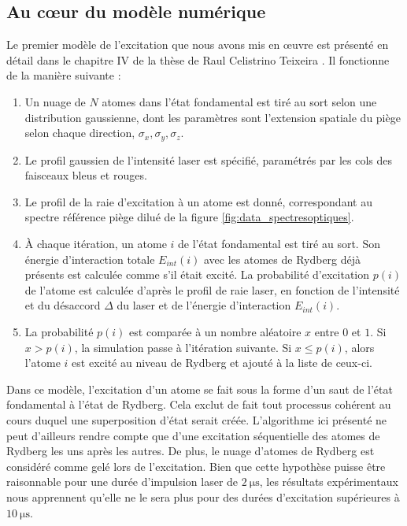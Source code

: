 	\subsection{Au c\oe ur du modèle numérique}\label{subsec:algo_1}
\noindent Le premier modèle de l'excitation que nous avons mis en \oe uvre est présenté en détail dans le chapitre IV de la thèse de Raul Celistrino Teixeira \cite{PHD_CELISTRINO}.
Il fonctionne de la manière suivante :
\begin{enumerate}
	\item Un nuage de $N$ atomes dans l'état fondamental est tiré au sort selon une distribution gaussienne, dont les paramètres sont l'extension spatiale du piège selon chaque direction, $\sigma_x,\sigma_y,\sigma_z$.
	\item Le profil gaussien de l'intensité laser est spécifié, paramétrés par les cols des faisceaux bleus et rouges.
	\item Le profil de la raie d'excitation à un atome est donné, correspondant au spectre \og référence piège dilué \fg{} de la figure \eqref{fig:data_spectresoptiques}.
	\item \`A chaque itération, un atome $i$ de l'état fondamental est tiré au sort.
	Son énergie d'interaction totale $E_{int}(i)$ avec les atomes de Rydberg déjà présents est calculée comme s'il était excité.
	La probabilité d'excitation $p(i)$ de l'atome est calculée d'après le profil de raie laser, en fonction de l'intensité  et du désaccord $\Delta$ du laser et de l'énergie d'interaction $E_{int}(i)$.
	\item La probabilité $p(i)$ est comparée à un nombre aléatoire $x$ entre $0$ et $1$. Si $x > p(i)$, la simulation passe à l'itération suivante.
	Si $x\leq p(i)$, alors l'atome $i$ est excité au niveau de Rydberg et ajouté à la liste de ceux-ci.
\end{enumerate}
%
Dans ce modèle, l'excitation d'un atome se fait sous la forme d'un \og saut \fg{} de l'état fondamental à l'état de Rydberg.
Cela exclut de fait tout processus cohérent au cours duquel une superposition d'état serait créée.
L'algorithme ici présenté ne peut d'ailleurs rendre compte que d'une excitation séquentielle des atomes de Rydberg les uns après les autres.
De plus, le nuage d'atomes de Rydberg est considéré comme gelé lors de l'excitation.
Bien que cette hypothèse puisse être raisonnable pour une durée d'impulsion laser de $\SI{2}{\us}$, les résultats expérimentaux nous apprennent qu'elle ne le sera plus pour des durées d'excitation supérieures à $\SI{10}{\us}$.

